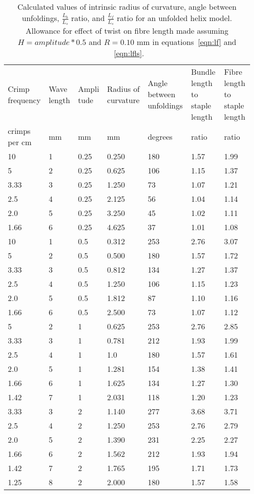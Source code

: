 %

\begin{table}[htp]
\centering
\caption{Calculated values of intrinsic radius of curvature, angle between unfoldings, $\frac{L_{b}}{L_{s}}$ ratio, and $\frac{L_{f}}{L_{s}}$ ratio for an unfolded helix model. Allowance for effect of twist on fibre length made assuming $H = amplitude * 0.5$ and $R = 0.10$ mm in equations~\ref{eqn:lf} and ~\ref{eqn:lfls}.}
\label{tab:unf}
\vspace{0.1in}
\begin{tabular}{p{0.6in}|p{0.4in}|p{0.4in}|p{0.6in}|p{0.6in}|p{0.6in}|p{0.6in}}  \hline
    Crimp frequency & Wave length  & Ampli tude & Radius of curvature & Angle between unfoldings & Bundle length to staple length & Fibre length to staple length \\ 
  crimps per cm & mm & mm & mm & degrees & ratio  & ratio\\ \hline
 10    & 1 & 0.25 & 0.250 & 180 & 1.57 & 1.99 \\
  5    & 2 & 0.25 & 0.625 & 106 & 1.15 & 1.37 \\
  3.33 & 3 & 0.25 & 1.250 &  73 & 1.07 & 1.21 \\
  2.5  & 4 & 0.25 & 2.125 &  56 & 1.04 & 1.14 \\
  2.0  & 5 & 0.25 & 3.250 &  45 & 1.02 & 1.11 \\
  1.66 & 6 & 0.25 & 4.625 &  37 & 1.01 & 1.08 \\ \hline
 10    & 1 & 0.5 & 0.312 & 253 & 2.76  & 3.07 \\
  5    & 2 & 0.5 & 0.500 & 180 & 1.57  & 1.72 \\
  3.33 & 3 & 0.5 & 0.812 & 134 & 1.27  & 1.37 \\
  2.5  & 4 & 0.5 & 1.250 & 106 & 1.15  & 1.23 \\
  2.0  & 5 & 0.5 & 1.812 &  87 & 1.10  & 1.16 \\
  1.66 & 6 & 0.5 & 2.500 &  73 & 1.07  & 1.12 \\ \hline
  5    & 2 & 1   & 0.625 & 253 & 2.76  & 2.85 \\
  3.33 & 3 & 1   & 0.781 & 212 & 1.93  & 1.99 \\
  2.5  & 4 & 1   & 1.0   & 180 & 1.57  & 1.61 \\
  2.0  & 5 & 1   & 1.281 & 154 & 1.38  & 1.41 \\
  1.66 & 6 & 1   & 1.625 & 134 & 1.27  & 1.30 \\
  1.42 & 7 & 1   & 2.031 & 118 & 1.20  & 1.23 \\ \hline
  3.33 & 3 & 2   & 1.140 & 277 & 3.68  & 3.71 \\
  2.5  & 4 & 2   & 1.250 & 253 & 2.76  & 2.79 \\
  2.0  & 5 & 2   & 1.390 & 231 & 2.25  & 2.27 \\
  1.66 & 6 & 2   & 1.562 & 212 & 1.93  & 1.94 \\
  1.42 & 7 & 2   & 1.765 & 195 & 1.71  & 1.73 \\
  1.25 & 8 & 2   & 2.000 & 180 & 1.57  & 1.58 \\ \hline
\end{tabular}
\end{table}

%
